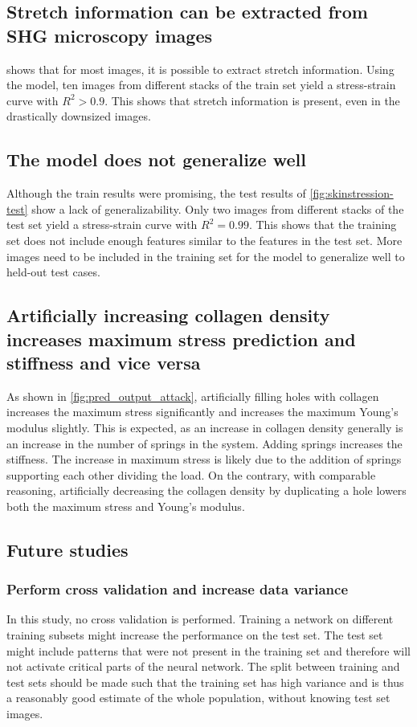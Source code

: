 \subsection{Stretch information can be extracted from SHG microscopy images}
 shows that for most images, it is possible to extract stretch information.
Using the model, ten images from different stacks of the train set yield a stress-strain curve with $R^2>0.9$.
This shows that stretch information is present, even in the drastically downsized images.

\subsection{The model does not generalize well}
Although the train results were promising, the test results of \cref{fig:skinstression-test} show a lack of generalizability.
Only two images from different stacks of the test set yield a stress-strain curve with $R^2=0.99$.
This shows that the training set does not include enough features similar to the features in the test set.
More images need to be included in the training set for the model to generalize well to held-out test cases.

\subsection{Artificially increasing collagen density increases maximum stress prediction and stiffness and vice versa}
As shown in \cref{fig:pred_output_attack}, artificially filling holes with collagen increases the maximum stress significantly and increases the maximum Young's modulus slightly.
This is expected, as an increase in collagen density generally is an increase in the number of springs in the system.
Adding springs increases the stiffness.
The increase in maximum stress is likely due to the addition of springs supporting each other dividing the load.
On the contrary, with comparable reasoning, artificially decreasing the collagen density by duplicating a hole lowers both the maximum stress and Young's modulus.

\subsection{Future studies}
\subsubsection{Perform cross validation and increase data variance}
In this study, no cross validation is performed.
Training a network on different training subsets might increase the performance on the test set.
The test set might include patterns that were not present in the training set and therefore will not activate critical parts of the neural network.
The split between training and test sets should be made such that the training set has high variance and is thus a reasonably good estimate of the whole population, without knowing test set images.

